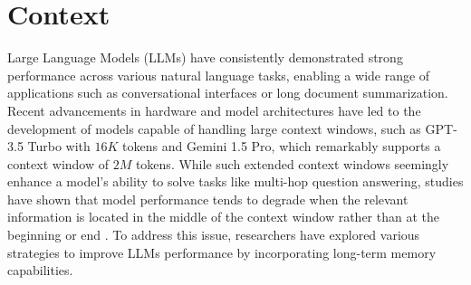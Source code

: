 \section{Context}
\label{sec:context}

Large Language Models (LLMs) have consistently demonstrated strong performance across various natural language tasks, enabling a wide range of applications such as conversational interfaces or long document summarization. Recent advancements in hardware and model architectures have led to the development of models capable of handling large context windows, such as GPT-3.5 Turbo with $16K$ tokens and Gemini 1.5 Pro, which remarkably supports a context window of $2M$ tokens. While such extended context windows seemingly enhance a model's ability to solve tasks like multi-hop question answering, studies have shown that model performance tends to degrade when the relevant information is located in the middle of the context window rather than at the beginning or end \cite{liu2023lostmiddlelanguagemodels}. To address this issue, researchers have explored various strategies to improve LLMs performance by incorporating long-term memory capabilities.\\

